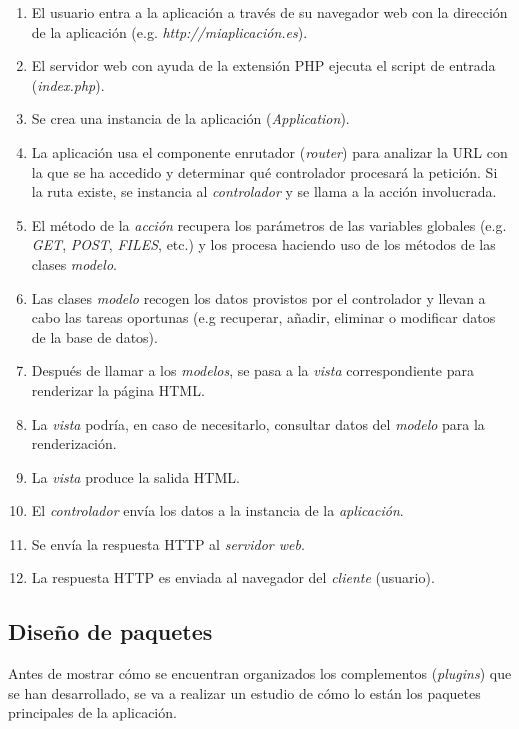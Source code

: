 \documentclass[
]{article}
\providecommand{\tightlist}{%
  \setlength{\itemsep}{0pt}\setlength{\parskip}{0pt}}
\begin{document}
\begin{enumerate}
\def\labelenumi{\arabic{enumi}.}
\tightlist
\item
  El usuario entra a la aplicación a través de su navegador web con la
  dirección de la aplicación (e.g. \emph{http://miaplicación.es}).
\item
  El servidor web con ayuda de la extensión PHP ejecuta el script de
  entrada (\emph{index.php}).
\item
  Se crea una instancia de la aplicación (\emph{Application}).
\item
  La aplicación usa el componente enrutador (\emph{router}) para
  analizar la URL con la que se ha accedido y determinar qué controlador
  procesará la petición. Si la ruta existe, se instancia al
  \emph{controlador} y se llama a la acción involucrada.
\item
  El método de la \emph{acción} recupera los parámetros de las variables
  globales (e.g. \emph{GET}, \emph{POST}, \emph{FILES}, etc.) y los
  procesa haciendo uso de los métodos de las clases \emph{modelo}.
\item
  Las clases \emph{modelo} recogen los datos provistos por el
  controlador y llevan a cabo las tareas oportunas (e.g recuperar,
  añadir, eliminar o modificar datos de la base de datos).
\item
  Después de llamar a los \emph{modelos}, se pasa a la \emph{vista}
  correspondiente para renderizar la página HTML.
\item
  La \emph{vista} podría, en caso de necesitarlo, consultar datos del
  \emph{modelo} para la renderización.
\item
  La \emph{vista} produce la salida HTML.
\item
  El \emph{controlador} envía los datos a la instancia de la
  \emph{aplicación}.
\item
  Se envía la respuesta HTTP al \emph{servidor web}.
\item
  La respuesta HTTP es enviada al navegador del \emph{cliente}
  (usuario).
\end{enumerate}

\hypertarget{diseuxf1o-de-paquetes}{%
\subsection{Diseño de paquetes}\label{diseuxf1o-de-paquetes}}

Antes de mostrar cómo se encuentran organizados los complementos
(\emph{plugins}) que se han desarrollado, se va a realizar un estudio de
cómo lo están los paquetes principales de la aplicación.
\end{document}
